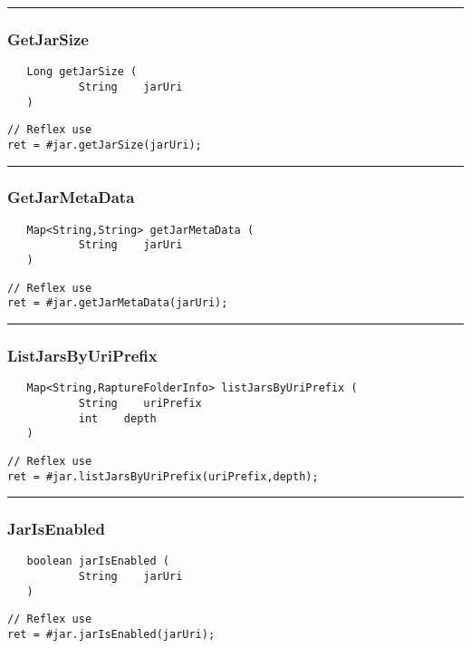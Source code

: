 \rule{15cm}{2pt}
\subsubsection{GetJarSize}
\label{Api:GetJarSize}
\begin{verbatim}
   Long getJarSize (
           String    jarUri
   )
\end{verbatim}
\begin{lstlisting}[language=reflex]
// Reflex use
ret = #jar.getJarSize(jarUri);
\end{lstlisting}



\rule{15cm}{2pt}
\subsubsection{GetJarMetaData}
\label{Api:GetJarMetaData}
\begin{verbatim}
   Map<String,String> getJarMetaData (
           String    jarUri
   )
\end{verbatim}
\begin{lstlisting}[language=reflex]
// Reflex use
ret = #jar.getJarMetaData(jarUri);
\end{lstlisting}



\rule{15cm}{2pt}
\subsubsection{ListJarsByUriPrefix}
\label{Api:ListJarsByUriPrefix}
\begin{verbatim}
   Map<String,RaptureFolderInfo> listJarsByUriPrefix (
           String    uriPrefix
           int    depth
   )
\end{verbatim}
\begin{lstlisting}[language=reflex]
// Reflex use
ret = #jar.listJarsByUriPrefix(uriPrefix,depth);
\end{lstlisting}



\rule{15cm}{2pt}
\subsubsection{JarIsEnabled}
\label{Api:JarIsEnabled}
\begin{verbatim}
   boolean jarIsEnabled (
           String    jarUri
   )
\end{verbatim}
\begin{lstlisting}[language=reflex]
// Reflex use
ret = #jar.jarIsEnabled(jarUri);
\end{lstlisting}



